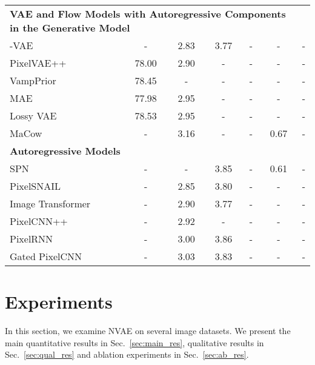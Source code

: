 \documentclass{article}
\begin{document}
\begin{table*}
{\begin{tabular}{lcccccc}
        \midrule
        \midrule
        \multicolumn{6}{l}{\bf VAE and Flow Models with Autoregressive Components in the Generative Model} \\
        -VAE~\cite{razavi2019collapse} & - & 2.83  & 3.77  & - & - & -\\
        PixelVAE++~\cite{sadeghi2019pixelvae++}
                          & 78.00 & 2.90  & -  & - & - & -\\
        VampPrior~\cite{tomczak2018VampPrior}         & 78.45 & - & - & - & - & - \\
        MAE~\cite{ma2019mae}               & 77.98 & 2.95 & - & - & - & -\\
        Lossy VAE~\cite{chen2016lossy}         & 78.53 & 2.95 & - & - & -  & -\\
        MaCow~\cite{ma19MaCow}             & - & 3.16 & - & - & 0.67 & - \\
        \midrule
        \multicolumn{6}{l}{\bf Autoregressive Models} \\
        SPN~\cite{menick2018spn}                & - & - & 3.85 & - & 0.61 & - \\
        PixelSNAIL~\cite{chen2018pixelsnail}         & - & 2.85 & 3.80 & - & - & - \\
        Image Transformer~\cite{parmar2018image}  & - & 2.90 & 3.77 & - & - & -\\
        PixelCNN++~\cite{salimans2017pixelcnn++}         & - & 2.92 & - & - & - & -\\
        PixelRNN~\cite{van2016pixel}           & - & 3.00 & 3.86 & - & - & -\\
        Gated PixelCNN~\cite{van2016conditional}     & - & 3.03 & 3.83 & - & - & -\\
        \bottomrule
        
        
    \end{tabular}}
\end{table*}
 
\captionsetup{skip=2pt}

\section{Experiments}\label{sec:expr}

In this section, we examine NVAE on several image datasets. We present the main quantitative results in Sec.~\ref{sec:main_res}, qualitative results in Sec.~\ref{sec:qual_res} and ablation experiments in Sec.~\ref{sec:ab_res}.
\end{document}
